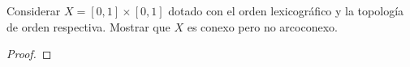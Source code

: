 \documentclass{article}
\theoremstyle{definition}
\newenvironment{ejercicio}[1]{\begin{trivlist}
\item[\hskip \labelsep {\bfseries Ejercicio}\hskip \labelsep {\bfseries #1.}]}{\end{trivlist}}
\begin{document}
\begin{ejercicio}{C5}
    Considerar \(X = [0, 1] \times [0, 1]\) dotado con el orden lexicográfico y la topología de orden respectiva. Mostrar que \(X\) es conexo pero no arcoconexo.
\end{ejercicio}

\begin{proof}
\end{proof}
\end{document}
